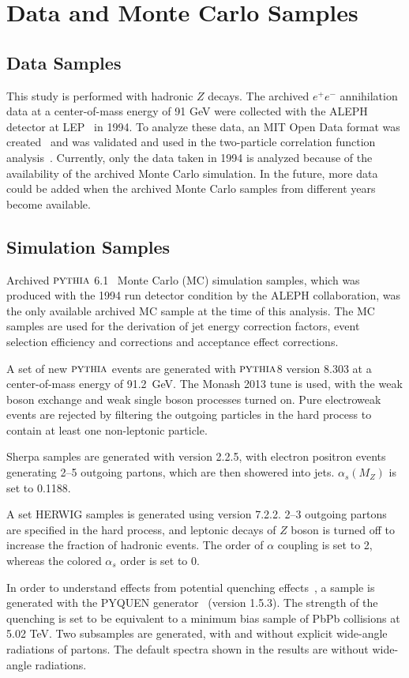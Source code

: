 
\section{Data and Monte Carlo Samples}
\label{Section:Samples}

\subsection{Data Samples}

This study is performed with hadronic $Z$ decays. The archived $e^+e^-$ annihilation data at a center-of-mass energy of 91 GeV were collected with the ALEPH detector at LEP~\cite{Decamp:1990jra} in 1994. To analyze these data, an MIT Open Data format was created~\cite{Tripathee:2017ybi} and was validated and used in the two-particle correlation function analysis~\cite{Badea:2019vey}. Currently, only the data taken in 1994 is analyzed because of the availability of the archived Monte Carlo simulation. In the future, more data could be added when the archived Monte Carlo samples from different years become available.

\subsection{Simulation Samples}

Archived $\textsc{pythia}$ 6.1~\cite{Sjostrand:2000wi} Monte Carlo (MC) simulation samples, which was produced with the 1994 run detector condition by the ALEPH collaboration, was the only available archived MC sample at the time of this analysis. The MC samples are used for the derivation of jet energy correction factors, event selection efficiency and corrections and acceptance effect corrections.

A set of new $\textsc{pythia}$ events are generated with $\textsc{pythia}$8 version 8.303 at a center-of-mass energy of 91.2~GeV.  The Monash 2013 tune is used, with the weak boson exchange and weak single boson processes turned on.  Pure electroweak events are rejected by filtering the outgoing particles in the hard process to contain at least one non-leptonic particle.

Sherpa samples are generated with version 2.2.5, with electron positron events generating 2--5 outgoing partons, which are then showered into jets.  $\alpha_s (M_Z)$ is set to 0.1188.

A set HERWIG samples\cite{Bellm:2015jjp} is generated using version 7.2.2.  2--3 outgoing partons are specified in the hard process, and leptonic decays of $Z$ boson is turned off to increase the fraction of hadronic events.  The order of $\alpha$ coupling is set to 2, whereas the colored $\alpha_s$ order is set to 0.

In order to understand effects from potential quenching effects~\cite{Bjorken:1982tu,ATLAS:2010isq,CMS:2011iwn}, a sample is generated with the PYQUEN generator~\cite{Lokhtin:2005px} (version 1.5.3).  The strength of the quenching is set to be equivalent to a minimum bias sample of PbPb collisions at 5.02 TeV.  Two subsamples are generated, with and without explicit wide-angle radiations of partons.  The default spectra shown in the results are without wide-angle radiations.


\clearpage

